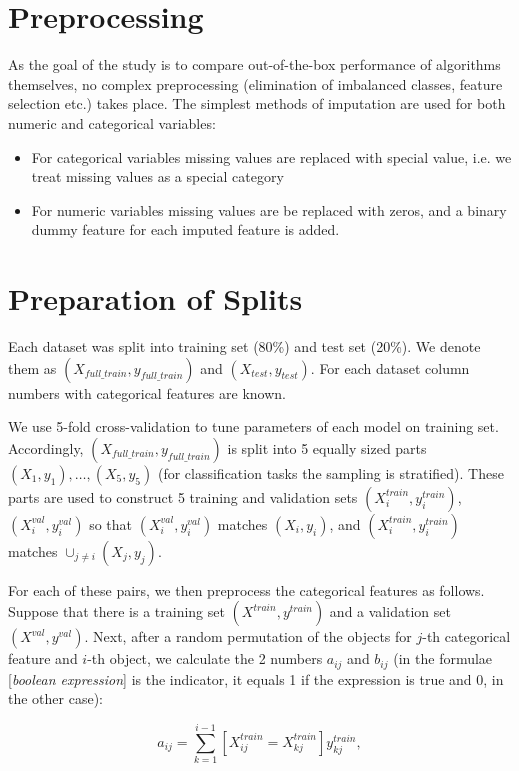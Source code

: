 \documentclass{article}
\begin{document}
\section{Preprocessing}
As the goal of the study is to compare out-of-the-box performance of algorithms themselves, no complex preprocessing (elimination of imbalanced classes, feature selection etc.) takes place. The simplest methods of imputation are used for both numeric and categorical variables:
\begin{itemize}
\item
For categorical variables missing values are replaced with special value, i.e. we treat missing values as a special category

\item
For numeric variables missing values are be replaced with zeros, and a binary dummy feature for each imputed feature is added.
\end{itemize}

\section{Preparation of Splits}
Each dataset was split into training set (80\%) and test set (20\%). We denote them as $(X_{full\_train}, y_{full\_train})$ and $(X_{test}, y_{test})$. For each dataset column numbers with categorical features are known.

We use 5-fold cross-validation to tune parameters of each model on training set. Accordingly, $(X_{full\_train}, y_{full\_train})$ is split into 5 equally sized parts $(X_1, y_1), \dots, (X_5, y_5)$ (for classification tasks the sampling is stratified). These parts are used to construct 5 training and validation sets $(X^{train}_i, y^{train}_i)$, $(X^{val}_i, y^{val}_i)$ so that $(X^{val}_i, y^{val}_i)$ matches $(X_i, y_i)$, and $(X^{train}_i,y^{train}_i)$ matches $\cup_{j\neq i}(X_j, y_j)$.

For each of these pairs, we then preprocess the categorical features as follows. Suppose that there is a training set $(X^{train}, y^{train})$ and a validation set $(X^{val}, y^{val})$. Next, after a random permutation of the objects for $j$-th categorical feature and $i$-th object, we calculate the 2 numbers $a_{ij}$ and $b_{ij}$ (in the formulae [{\itshape boolean expression}] is the indicator, it equals 1 if the expression is true and 0, in the other case):

$$a_{ij} = \sum_{k=1}^{i - 1}[X^{train}_{ij} = X^{train}_{kj}]y^{train}_{kj},$$
\end{document}
